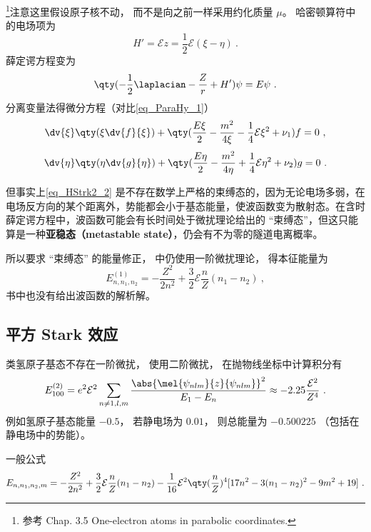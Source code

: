
\begin{issues}
\issueDraft
\end{issues}


\footnote{参考 \cite{Bransden} Chap. 3.5 One-electron atoms in parabolic coordinates.}注意这里假设原子核不动， 而不是向之前一样采用约化质量 $\mu$。 哈密顿算符中的电场项为
\begin{equation}\label{eq_HStrk2_1}
H' = \mathcal Ez = \frac12 \mathcal E (\xi - \eta)~.
\end{equation}
薛定谔方程变为
\begin{equation}\label{eq_HStrk2_2}
\qty(-\frac12 \laplacian - \frac{Z}{r} + H')\psi = E\psi~.
\end{equation}
分离变量法得微分方程（对比\autoref{eq_ParaHy_1}）
\begin{equation}
\dv{\xi} \qty(\xi \dv{f}{\xi}) + \qty(\frac{E \xi}{2} - \frac{m^2}{4\xi} -\frac14\mathcal E \xi^2 + \nu_1) f = 0~,
\end{equation}
\begin{equation}
\dv{\eta}\qty(\eta \dv{g}{\eta}) + \qty(\frac{E\eta}{2} - \frac{m^2}{4\eta} +\frac14\mathcal E \eta^2 + \nu_2)g = 0~.
\end{equation}

但事实上\autoref{eq_HStrk2_2} 是不存在数学上严格的束缚态的，因为无论电场多弱，在电场反方向的某个距离外，势能都会小于基态能量，使波函数变为散射态。在含时薛定谔方程中，波函数可能会有长时间处于微扰理论给出的 “束缚态”，但这只能算是一种\textbf{亚稳态（metastable state）}，仍会有不为零的隧道电离概率。

所以要求 “束缚态” 的能量修正，\cite{Bransden} 中仍使用一阶微扰理论， 得本征能量为
\begin{equation}
E_{n,n_1,n_2}^{(1)} = -\frac{Z^2}{2n^2} + \frac32 \mathcal E \frac{n}{Z}(n_1 - n_2)~,
\end{equation}
书中也没有给出波函数的解析解。

\subsection{平方 Stark 效应}
类氢原子基态不存在一阶微扰， 使用二阶微扰， 在抛物线坐标中计算积分有
\begin{equation}
E_{100}^{(2)} = e^2\mathcal E^2 \sum_{n\ne 1, l, m} \frac{\abs{\mel{\psi_{nlm}}{z}{\psi_{nlm}}}^2}{E_1 - E_n}
\approx - 2.25\frac{\mathcal E^2}{Z^4}~.
\end{equation}
例如氢原子基态能量 $-0.5$， 若静电场为 $0.01$， 则总能量为 $-0.500225$ （包括在静电场中的势能）。

一般公式
\begin{equation}
E_{n,n_1,n_2,m} = -\frac{Z^2}{2n^2} + \frac32 \mathcal E \frac{n}{Z} (n_1-n_2)
-\frac{1}{16}\mathcal E^2 \qty(\frac{n}{Z})^4 [17n^2-3(n_1-n_2)^2-9m^2+19]~.
\end{equation}
